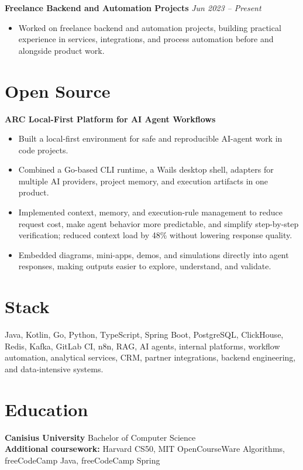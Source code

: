 \documentclass[10pt,a4paper]{article}
\begin{document}
\textbf{Freelance Backend and Automation Projects} \hfill \textit{Jun 2023 -- Present}
\begin{itemize}
  \item Worked on freelance backend and automation projects, building practical experience in services, integrations, and process automation before and alongside product work.
\end{itemize}

\section*{Open Source}

\textbf{ARC \textbar{} Local-First Platform for AI Agent Workflows}
\begin{itemize}
  \item Built a local-first environment for safe and reproducible AI-agent work in code projects.
  \item Combined a Go-based CLI runtime, a Wails desktop shell, adapters for multiple AI providers, project memory, and execution artifacts in one product.
  \item Implemented context, memory, and execution-rule management to reduce request cost, make agent behavior more predictable, and simplify step-by-step verification; reduced context load by 48\% without lowering response quality.
  \item Embedded diagrams, mini-apps, demos, and simulations directly into agent responses, making outputs easier to explore, understand, and validate.
\end{itemize}

\section*{Stack}
Java, Kotlin, Go, Python, TypeScript, Spring Boot, PostgreSQL, ClickHouse, Redis, Kafka, GitLab CI, n8n, RAG, AI agents, internal platforms, workflow automation, analytical services, CRM, partner integrations, backend engineering, and data-intensive systems.

\section*{Education}
\textbf{Canisius University} \textbar{} Bachelor of Computer Science\\
\textbf{Additional coursework:} Harvard CS50, MIT OpenCourseWare Algorithms, freeCodeCamp Java, freeCodeCamp Spring
\end{document}
